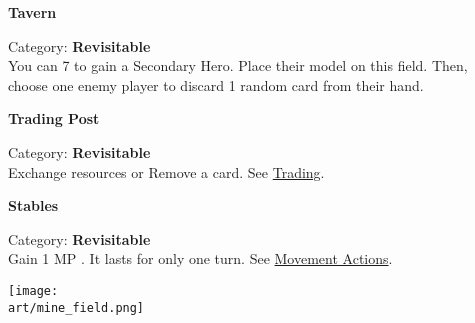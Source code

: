 \begin{multicols*}{2}
\medskip

\begin{minipage}{\linewidth}
  \begin{center}
    \textbf{Tavern}\medskip
  \end{center}
  \small{Category: \textbf{Revisitable}\\
    You can 
    7 
    to gain a Secondary Hero.
    Place their model on this field.
    Then, choose one enemy player to discard 1 random card from their hand.}
\end{minipage}

\medskip

\begin{minipage}{\linewidth}
  \begin{center}
    \hypertarget{Trading Post}{\textbf{Trading Post}}\medskip
  \end{center}
  \small{Category: \textbf{Revisitable}\\
    Exchange resources or Remove a card.
    See \protect\hyperlink{Trading}{Trading}.}
\end{minipage}

\medskip

\begin{minipage}{\linewidth}
  \begin{center}
    \textbf{Stables}\medskip
  \end{center}
  \small{Category: \textbf{Revisitable}\\
    Gain 1 MP .
    It lasts for only one turn.
    See \protect\hyperlink{Movement}{Movement Actions}.
  }
\end{minipage}

\vfill
\begin{center}
  \texttt{[image: \\art/mine\_field.png]}
\end{center}

\end{multicols*}


